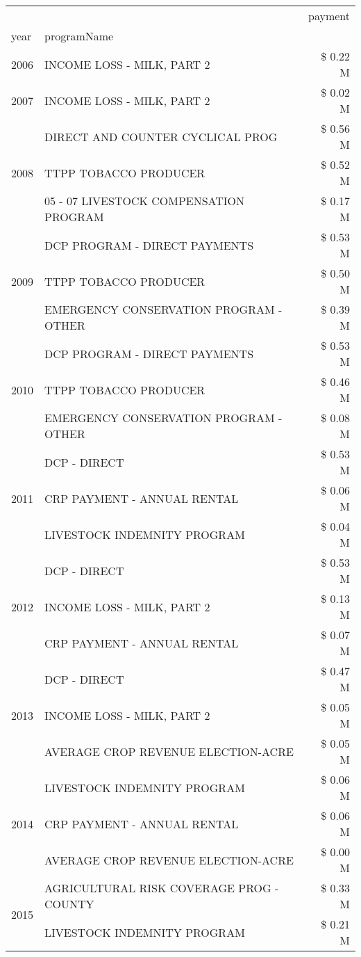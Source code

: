 \begin{tabular}{llr}
\toprule
 &  & payment \\
year & programName &  \\
\midrule
2006 & INCOME LOSS - MILK, PART 2 & \$ 0.22 M \\
\cline{1-3}
2007 & INCOME LOSS - MILK, PART 2 & \$ 0.02 M \\
\cline{1-3}
\multirow[t]{3}{*}{2008} & DIRECT AND COUNTER CYCLICAL PROG & \$ 0.56 M \\
 & TTPP TOBACCO PRODUCER & \$ 0.52 M \\
 & 05 - 07 LIVESTOCK COMPENSATION PROGRAM & \$ 0.17 M \\
\cline{1-3}
\multirow[t]{3}{*}{2009} & DCP PROGRAM - DIRECT PAYMENTS & \$ 0.53 M \\
 & TTPP TOBACCO PRODUCER & \$ 0.50 M \\
 & EMERGENCY CONSERVATION PROGRAM - OTHER & \$ 0.39 M \\
\cline{1-3}
\multirow[t]{3}{*}{2010} & DCP PROGRAM - DIRECT PAYMENTS & \$ 0.53 M \\
 & TTPP TOBACCO PRODUCER & \$ 0.46 M \\
 & EMERGENCY CONSERVATION PROGRAM - OTHER & \$ 0.08 M \\
\cline{1-3}
\multirow[t]{3}{*}{2011} & DCP - DIRECT & \$ 0.53 M \\
 & CRP PAYMENT - ANNUAL RENTAL & \$ 0.06 M \\
 & LIVESTOCK INDEMNITY PROGRAM & \$ 0.04 M \\
\cline{1-3}
\multirow[t]{3}{*}{2012} & DCP - DIRECT & \$ 0.53 M \\
 & INCOME LOSS - MILK, PART 2 & \$ 0.13 M \\
 & CRP PAYMENT - ANNUAL RENTAL & \$ 0.07 M \\
\cline{1-3}
\multirow[t]{3}{*}{2013} & DCP - DIRECT & \$ 0.47 M \\
 & INCOME LOSS - MILK, PART 2 & \$ 0.05 M \\
 & AVERAGE CROP REVENUE ELECTION-ACRE & \$ 0.05 M \\
\cline{1-3}
\multirow[t]{3}{*}{2014} & LIVESTOCK INDEMNITY PROGRAM & \$ 0.06 M \\
 & CRP PAYMENT - ANNUAL RENTAL & \$ 0.06 M \\
 & AVERAGE CROP REVENUE ELECTION-ACRE & \$ 0.00 M \\
\cline{1-3}
\multirow[t]{3}{*}{2015} & AGRICULTURAL RISK COVERAGE PROG - COUNTY & \$ 0.33 M \\
 & LIVESTOCK INDEMNITY PROGRAM & \$ 0.21 M \\

\end{tabular}
